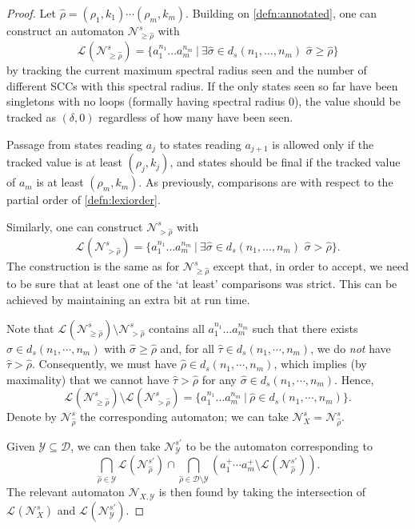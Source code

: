 \documentclass[10pt,a4paper]{amsart}
\numberwithin{equation}{section}
\theoremstyle{plain}
\theoremstyle{definition}
\theoremstyle{remark}
\newcommand\pbra[1]{\left( #1 \right)}
\newcommand\lng[2]{\mathcal{L}_{#1}(#2)}
\newcommand\dgf{d}
\begin{document}
\begin{proof}
Let $\hat{\rho}=(\rho_1,k_1)\cdots (\rho_m,k_m)$.
Building on \cref{defn:annotated},
one can construct an automaton $\mathcal{N}^s_{{\ge \hat{\rho}}}$ with
\[
  \lng{}{\mathcal{N}^s_{{\ge \hat{\rho}}}} = \{a_1^{n_1} \dots a_m^{n_m}\ |\ { \exists\hat{\sigma} \in \dgf_s(n_1,\dots,n_m)\,\, \hat{\sigma}\ge \hat{\rho} }\}
\]
by tracking the current maximum spectral radius seen and the number of different SCCs with this spectral radius. If the only states seen so far have been singletons with no loops (formally having spectral radius $0$), the value should be tracked as $(\delta,0)$ regardless of how many have been seen.

Passage from states reading $a_j$ to states reading $a_{j+1}$ is allowed only if the tracked value is at least $(\rho_j, k_j)$,
and states should be final if the tracked value of $a_m$ is at least $(\rho_m, k_m)$.
As previously, comparisons are with respect to the partial order of \cref{defn:lexiorder}.

Similarly, one can construct $\mathcal{N}^s_{{>\hat{\rho}}}$ with
\[
  \lng{}{\mathcal{N}^s_{{>\hat{\rho}}}} = \{a_1^{n_1}\dots a_m^{n_m}\ |\ { \exists\hat{\sigma} \in \dgf_s(n_1,\dots,n_m)\,\, \hat{\sigma} > \hat{\rho} }\}.
\]
The construction is the same as for $\mathcal{N}^s_{{\ge \hat{\rho}}}$ except that, in order to accept, we need to be sure that at least
one of the `at least' comparisons was strict. This can be achieved by maintaining an extra bit at run time.

Note that $\lng{}{\mathcal{N}^s_{{\ge \hat{\rho}}}} \setminus \mathcal{N}^s_{{>\hat{\rho}}}$ contains  all $a_1^{n_1} \dots a_m^{n_m}$ such that there exists $\hat{\sigma}\in \dgf_s(n_1,\cdots,n_m)$ with
$\hat{\sigma}\ge \hat{\rho}$ and, for all $\hat{\tau}\in \dgf_s(n_1,\cdots,n_m)$, we do \emph{not} have $\hat{\tau}>\hat{\rho}$. Consequently, we must have $\hat{\rho}\in \dgf_s(n_1,\cdots,n_m)$, which
implies (by maximality) that we cannot have $\hat{\tau} > \hat{\rho}$ for any $\hat{\sigma}\in   \dgf_s(n_1,\cdots,n_m)$. Hence,
\[
\lng{}{\mathcal{N}^s_{{\ge \hat{\rho}}}} \setminus \lng{}{\mathcal{N}^s_{{>\hat{\rho}}}} = \{ a_1^{n_1}\dots a_m^{n_m} \ |\ \hat{\rho}\in \dgf_s(n_1,\cdots,n_m) \}.
\]
Denote by $\mathcal{N}^s_{{\hat{\rho}}}$ the corresponding automaton;
we can take $\mathcal{N}^s_{X} = \mathcal{N}^s_{{\hat{\rho}}}$.

Given $\mathcal{Y}\subseteq \mathcal{D}$, we can then take $\mathcal{N}^{s'}_{\mathcal{Y}}$ to be the automaton corresponding to
\[
\bigcap_{\hat{\rho}\in\mathcal{Y}} \lng{}{\mathcal{N}^{s'}_{{\hat{\rho}}}} \cap \bigcap_{\hat{\rho}\in \mathcal{D}\setminus\mathcal{Y}} \pbra{a_1^+\cdots a_m^+ \setminus \lng{}{\mathcal{N}^{s'}_{{\hat{\rho}}}}}.
\]
The relevant automaton $\mathcal{N}_{X,\mathcal{Y}}$   is then found by taking  the intersection of $\lng{}{\mathcal{N}^s_{{X}}}$ and $\lng{}{\mathcal{N}^{s'}_{\mathcal{Y}}}$.\qedhere
\end{proof}
\end{document}
